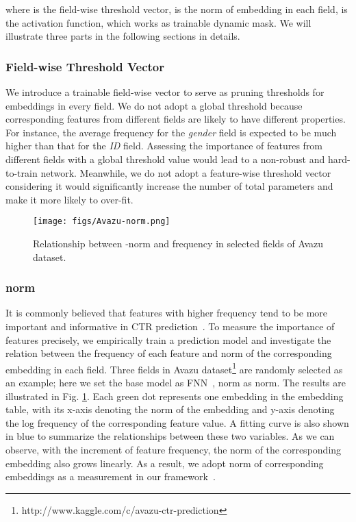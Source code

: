 \documentclass[sigconf]{acmart}
\begin{document}
where  is the field-wise threshold vector,  is the  norm of embedding in each field,  is the activation function, which works as trainable dynamic mask. We will illustrate three parts in the following sections in details.

\subsubsection{Field-wise Threshold Vector}
We introduce a trainable field-wise vector  to serve as pruning thresholds for embeddings in every field. We do not adopt a global threshold because corresponding features from different fields are likely to have different properties. For instance, the average frequency for the \textit{gender} field is expected to be much higher than that for the \textit{ID} field. Assessing the importance of features from different fields with a global threshold value would lead to a non-robust and hard-to-train network. Meanwhile, we do not adopt a feature-wise threshold vector considering it would significantly increase the number of total parameters and make it more likely to over-fit.

\begin{figure}[!htbp]
    \centering
    \texttt{[image: figs/Avazu-norm.png]}
    \vspace{-5pt}
    \caption{Relationship between -norm and frequency in selected fields of Avazu dataset.}
    \vspace{-10pt}
    \label{fig:field}
\end{figure}

\subsubsection{ norm}
It is commonly believed that features with higher frequency tend to be more important and informative in CTR prediction~\cite{AMTL,doublehashing}. To measure the importance of features precisely, we empirically train a prediction model and investigate the relation between the frequency of each feature and  norm of the corresponding embedding in each field. Three fields in Avazu dataset\footnote{http://www.kaggle.com/c/avazu-ctr-prediction} are randomly selected as an example; here we set the base model as FNN~\cite{FNN},  norm as  norm. The results are illustrated in Fig. \ref{fig:field}. Each green dot represents one embedding in the embedding table, with its x-axis denoting the  norm of the embedding and y-axis denoting the log frequency of the corresponding feature value. A fitting curve is also shown in blue to summarize the relationships between these two variables. As we can observe, with the increment of feature frequency, the  norm of the corresponding embedding also grows linearly. As a result, we adopt  norm of corresponding embeddings as a measurement in our framework~\cite{DST,weight_connect}. 
\end{document}
